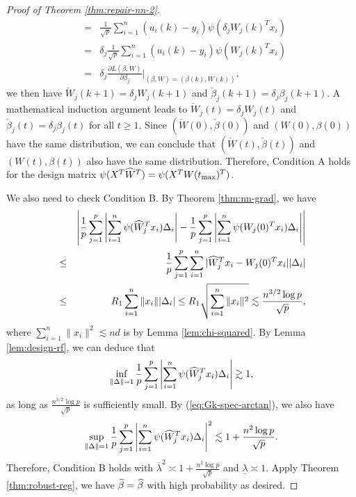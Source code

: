 \begin{proof}[Proof of Theorem \ref{thm:repair-nn-2}]
\begin{eqnarray*}
&=& \frac{1}{\sqrt{p}}\sum_{i=1}^n({u}_i(k)-y_i)\psi(\delta_j{W}_j(k)^Tx_i) \\
&=& \delta_j\frac{1}{\sqrt{p}}\sum_{i=1}^n({u}_i(k)-y_i)\psi({W}_j(k)^Tx_i) \\
&=& \delta_j\frac{\partial L(\beta,W)}{\partial \beta_j}|_{(\beta,W)=({\beta}(k),{W}(k))},
\end{eqnarray*}
we then have $\check{W}_j(k+1)=\delta_jW_j(k+1)$ and $\check{\beta}_j(k+1)=\delta_j\beta_j(k+1)$. A mathematical induction argument leads to $\check{W}_j(t)=\delta_jW_j(t)$ and $\check{\beta}_j(t)=\delta_j\beta_j(t)$ for all $t\geq 1$. Since $(\check{W}(0),\check{\beta}(0))$ and $(W(0),\beta(0))$ have the same distribution, we can conclude that $(\check{W}(t),\check{\beta}(t))$ and $(W(t),\beta(t))$ also have the same distribution. Therefore, Condition A holds for the design matrix $\psi(X^T\widehat{W}^T)=\psi(X^TW(t_{\max})^T)$.

We also need to check Condition B. By Theorem \ref{thm:nn-grad}, we have
\begin{eqnarray*}
&& \left|\frac{1}{p}\sum_{j=1}^p\left|\sum_{i=1}^n\psi(\wh{W}_j^Tx_i)\Delta_i\right| - \frac{1}{p}\sum_{j=1}^p\left|\sum_{i=1}^n\psi(W_j(0)^Tx_i)\Delta_i\right|\right| \\
&\leq& \frac{1}{p}\sum_{j=1}^p\sum_{i=1}^n|\wh{W}_j^Tx_i-W_j(0)^Tx_i||\Delta_i| \\
&\leq& R_1\sum_{i=1}^n\|x_i\||\Delta_i| \leq R_1\sqrt{\sum_{i=1}^n\|x_i\|^2} \lesssim \frac{n^{3/2}\log p}{\sqrt{p}},
\end{eqnarray*}
where $\sum_{i=1}^n\|x_i\|^2\lesssim nd$ is by Lemma \ref{lem:chi-squared}. By Lemma \ref{lem:design-rf}, we can deduce that
$$\inf_{\|\Delta\|=1}\frac{1}{p}\sum_{j=1}^p\left|\sum_{i=1}^n\psi(\widehat{W}_j^Tx_i)\Delta_i\right|\gtrsim 1,$$
as long as $\frac{n^{3/2}\log p}{\sqrt{p}}$ is sufficiently small. By (\ref{eq:Gk-spec-arctan}), we also have
$$\sup_{\|\Delta\|=1}\frac{1}{p}\sum_{j=1}^p\left|\sum_{i=1}^n\psi(\widehat{W}_j^Tx_i)\Delta_i\right|^2\lesssim 1+\frac{n^2\log p}{\sqrt{p}}.$$
Therefore, Condition B holds with $\overline{\lambda}^2\asymp 1+\frac{n^2\log p}{\sqrt{p}}$ and $\underline{\lambda}\asymp 1$. Apply Theorem \ref{thm:robust-reg}, we have $\widetilde{\beta}=\widehat{\beta}$ with high probability as desired.
\end{proof}